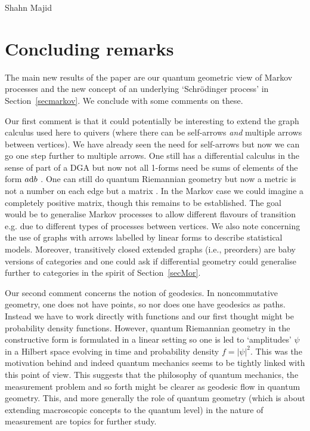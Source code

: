 \begin{artengenv}{Shahn Majid}
\section{Concluding remarks} \label{secrem}

The main new results of the paper are our quantum geometric view of Markov processes and the new concept of an underlying `Schr\"odinger process' in Section~\ref{secmarkov}. We conclude with some comments on these. 

Our first comment is that it could potentially be interesting to extend the graph calculus used here to quivers (where there can be self-arrows {\em and} multiple arrows between vertices). We have already seen the need for self-arrows but now we can go one step further to multiple arrows. One still has a differential calculus in the sense of part of a DGA but now not all 1-forms need be sums of elements of the form $a{\rm d} b$ \parencite{MaTao:dua}. One can still do quantum Riemannian geometry but now a metric is not a number on each edge but a matrix \parencite{MaTao:dua}. In the Markov case we could imagine a completely positive matrix, though this remains to be established. The goal would be to generalise Markov processes to allow different flavours of transition e.g. due to different types of processes between vertices. We also note \parencite{Sturm} concerning the use of graphs with arrows labelled by linear forms to describe statistical models. Moreover, transitively closed extended graphs (i.e., preorders) are baby versions of categories and one could ask if differential geometry could generalise further to categories in the spirit of Section~\ref{secMor}.

Our second comment concerns the notion of geodesics. In noncommutative geometry, one does not have points, so nor does one have geodesics as paths. Instead we have to work directly with functions and our first thought might be probability density functions. However, quantum Riemannian geometry in the constructive form \parencite{BegMa} is formulated in a linear setting so one is led to `amplitudes' $\psi$ in a Hilbert space evolving in time and probability density $f=|\psi|^2$. This was the motivation behind \parencite{Beg:geo,BegMa:geo} and indeed quantum mechanics seems to be tightly linked with this point of view. This suggests that the philosophy of quantum mechanics, the measurement problem and so forth might be clearer as geodesic flow in quantum geometry. This, and more generally the role of quantum geometry (which is about extending macroscopic concepts to the quantum level) in the nature of measurement are topics for further study. 


\end{artengenv}
